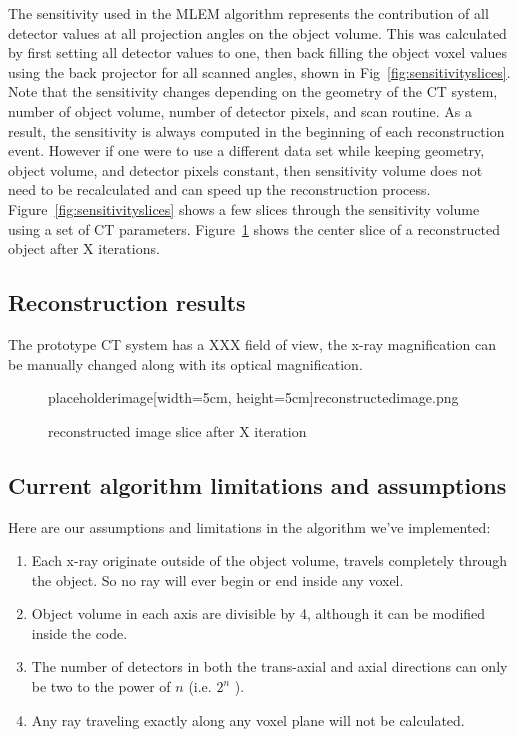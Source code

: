 The sensitivity used in the MLEM algorithm represents the contribution of all detector values at all projection angles on the object volume.  This was calculated by first setting all detector values to one, then back filling the object voxel values using the back projector for all scanned angles, shown in Fig~\ref{fig:sensitivityslices}.  Note that the sensitivity changes depending on the geometry of the CT system, number of object volume, number of detector pixels, and scan routine.  As a result, the sensitivity is always computed in the beginning of each reconstruction event.  However if one were to use a different data set while keeping geometry, object volume, and detector pixels constant, then sensitivity volume does not need to be recalculated and can speed up the reconstruction process.  Figure~\ref{fig:sensitivityslices} shows a few slices through the sensitivity volume using a set of CT parameters.
Figure~\ref{fig:reconstructedimage} shows the center slice of a reconstructed object after X iterations.

\subsection{Reconstruction results}
The prototype CT system has a XXX field of view, the x-ray magnification can be manually changed along with its optical magnification.  
\begin{figure}
\centering
placeholderimage[width=5cm, height=5cm]{reconstructedimage.png}
\label{fig:reconstructedimage}
\caption{reconstructed image slice after X iteration}
\end{figure}

\subsection{Current algorithm limitations and assumptions}
Here are our assumptions and limitations in the algorithm we've implemented:
\begin{enumerate}
\item Each x-ray originate outside of the object volume, travels completely through the object.  So no ray will ever begin or end inside any voxel.
\item Object volume in each axis are divisible by 4, although it can be modified inside the code.
\item The number of detectors in both the trans-axial and axial directions can only be two to the power of $n$ (i.e. $2^n$ ).
\item Any ray traveling exactly along any voxel plane will not be calculated.
\end{enumerate}





